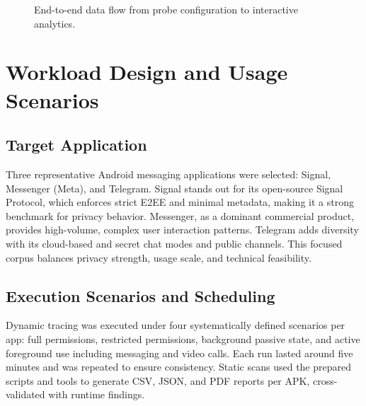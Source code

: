 \documentclass[a4paper,12pt]{report}
\begin{document}
\begin{figure}[H]
\centering
{}
\caption{End-to-end data flow from probe configuration to interactive analytics.}
\label{fig:pipeline}
\end{figure}

\section{Workload Design and Usage Scenarios}

\subsection{Target Application}
Three representative Android messaging applications were selected: Signal, Messenger (Meta), and Telegram. Signal stands out for its open-source Signal Protocol, which enforces strict E2EE and minimal metadata, making it a strong benchmark for privacy behavior. Messenger, as a dominant commercial product, provides high-volume, complex user interaction patterns. Telegram adds diversity with its cloud-based and secret chat modes and public channels. This focused corpus balances privacy strength, usage scale, and technical feasibility.

\subsection{Execution Scenarios and Scheduling}
Dynamic tracing was executed under four systematically defined scenarios per app: full permissions, restricted permissions, background passive state, and active foreground use including messaging and video calls. Each run lasted around five minutes and was repeated to ensure consistency. Static scans used the prepared scripts and tools to generate CSV, JSON, and PDF reports per APK, cross-validated with runtime findings.
\end{document}
